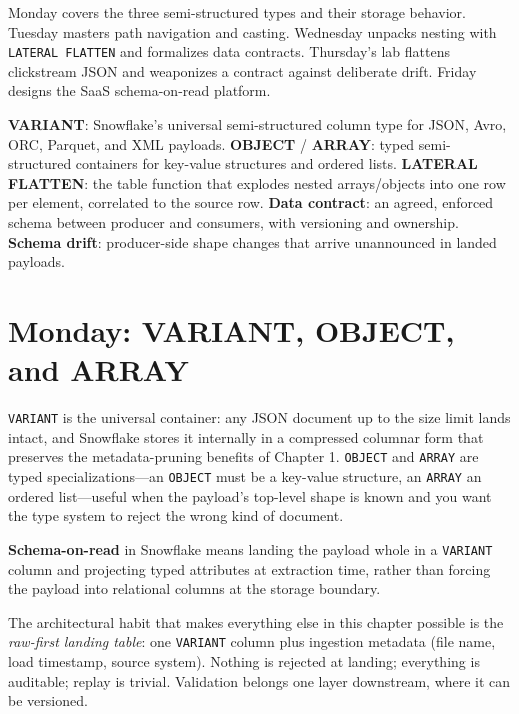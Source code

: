 Monday covers the three semi-structured types and their storage behavior. Tuesday masters path navigation and casting. Wednesday unpacks nesting with \texttt{LATERAL FLATTEN} and formalizes data contracts. Thursday's lab flattens clickstream JSON and weaponizes a contract against deliberate drift. Friday designs the SaaS schema-on-read platform.

\begin{keyterms}
\textbf{VARIANT}: Snowflake's universal semi-structured column type for JSON, Avro, ORC, Parquet, and XML payloads.\quad
\textbf{OBJECT} / \textbf{ARRAY}: typed semi-structured containers for key-value structures and ordered lists.\quad
\textbf{LATERAL FLATTEN}: the table function that explodes nested arrays/objects into one row per element, correlated to the source row.\quad
\textbf{Data contract}: an agreed, enforced schema between producer and consumers, with versioning and ownership.\quad
\textbf{Schema drift}: producer-side shape changes that arrive unannounced in landed payloads.
\end{keyterms}

\section{Monday: VARIANT, OBJECT, and ARRAY}
\texttt{VARIANT} is the universal container: any JSON document up to the size limit lands intact, and Snowflake stores it internally in a compressed columnar form that preserves the metadata-pruning benefits of Chapter 1. \texttt{OBJECT} and \texttt{ARRAY} are typed specializations---an \texttt{OBJECT} must be a key-value structure, an \texttt{ARRAY} an ordered list---useful when the payload's top-level shape is known and you want the type system to reject the wrong kind of document.

\begin{definitionbox}
\textbf{Schema-on-read} in Snowflake means landing the payload whole in a \texttt{VARIANT} column and projecting typed attributes at extraction time, rather than forcing the payload into relational columns at the storage boundary.
\end{definitionbox}

The architectural habit that makes everything else in this chapter possible is the \emph{raw-first landing table}: one \texttt{VARIANT} column plus ingestion metadata (file name, load timestamp, source system). Nothing is rejected at landing; everything is auditable; replay is trivial. Validation belongs one layer downstream, where it can be versioned.


